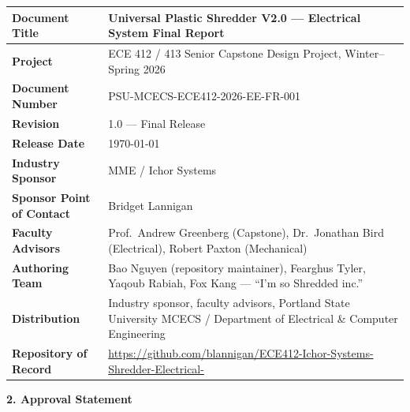 \documentclass[hidelinks,12pt]{article}
\begin{document}
\vspace{4pt}
\renewcommand{\arraystretch}{1.35}
\noindent\begin{tabularx}{\textwidth}{|>{\sffamily\bfseries\color{PSUgray}}p{}|X|}
\hline
\rowcolor{PSUgreen!15} Document Title & Universal Plastic Shredder V2.0 --- Electrical System Final Report \\\hline
Project & ECE 412 / 413 Senior Capstone Design Project, Winter--Spring 2026 \\\hline
Document Number & PSU-MCECS-ECE412-2026-EE-FR-001 \\\hline
Revision & 1.0 --- Final Release \\\hline
Release Date & \today \\\hline
Industry Sponsor & MME / Ichor Systems \\\hline
Sponsor Point of Contact & Bridget Lannigan \\\hline
Faculty Advisors & Prof.\ Andrew Greenberg (Capstone), Dr.\ Jonathan Bird (Electrical), Robert Paxton (Mechanical) \\\hline
Authoring Team & Bao Nguyen (repository maintainer), Fearghus Tyler, Yaqoub Rabiah, Fox Kang --- ``I'm so Shredded inc.'' \\\hline
Distribution & Industry sponsor, faculty advisors, Portland State University MCECS / Department of Electrical \& Computer Engineering \\\hline
Repository of Record & {\small\url{https://github.com/blannigan/ECE412-Ichor-Systems-Shredder-Electrical-}} \\\hline
\end{tabularx}
\renewcommand{\arraystretch}{1.0}

\vspace{18pt}

\noindent\textbf{\large\sffamily\color{PSUgreen} 2. Approval Statement}

\vspace{4pt}
\end{document}
